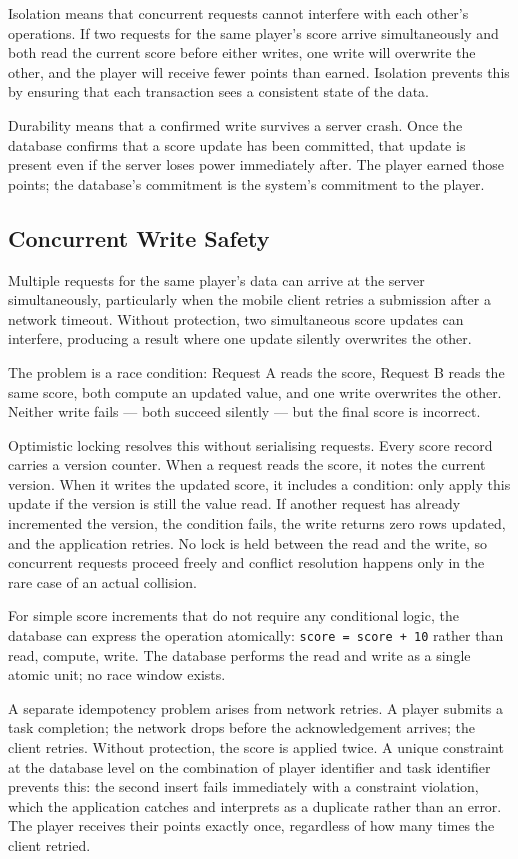 Isolation means that concurrent requests cannot interfere with each other's operations. If two requests for the same player's score arrive simultaneously and both read the current score before either writes, one write will overwrite the other, and the player will receive fewer points than earned. Isolation prevents this by ensuring that each transaction sees a consistent state of the data.

Durability means that a confirmed write survives a server crash. Once the database confirms that a score update has been committed, that update is present even if the server loses power immediately after. The player earned those points; the database's commitment is the system's commitment to the player.

\subsection{Concurrent Write Safety}

Multiple requests for the same player's data can arrive at the server simultaneously, particularly when the mobile client retries a submission after a network timeout. Without protection, two simultaneous score updates can interfere, producing a result where one update silently overwrites the other.

The problem is a race condition: Request A reads the score, Request B reads the same score, both compute an updated value, and one write overwrites the other. Neither write fails --- both succeed silently --- but the final score is incorrect.

Optimistic locking resolves this without serialising requests. Every score record carries a version counter. When a request reads the score, it notes the current version. When it writes the updated score, it includes a condition: only apply this update if the version is still the value read. If another request has already incremented the version, the condition fails, the write returns zero rows updated, and the application retries. No lock is held between the read and the write, so concurrent requests proceed freely and conflict resolution happens only in the rare case of an actual collision.

For simple score increments that do not require any conditional logic, the database can express the operation atomically: \texttt{score = score + 10} rather than read, compute, write. The database performs the read and write as a single atomic unit; no race window exists.

A separate idempotency problem arises from network retries. A player submits a task completion; the network drops before the acknowledgement arrives; the client retries. Without protection, the score is applied twice. A unique constraint at the database level on the combination of player identifier and task identifier prevents this: the second insert fails immediately with a constraint violation, which the application catches and interprets as a duplicate rather than an error. The player receives their points exactly once, regardless of how many times the client retried.

